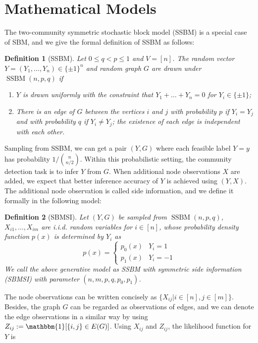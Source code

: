 \documentclass[conference]{IEEEtran}
\newtheorem{definition}{Definition}
\DeclareMathOperator{\SSBM}{SSBM}
\begin{document}
\section{Mathematical Models}\label{s:model}
The two-community symmetric stochastic block model (SSBM) is a special case of SBM, and we give the formal definition of SSBM as follows:
\begin{definition}[SSBM]
	Let $0\leq q<p\leq 1$ and $V=[n]$. The random vector $Y=(Y_1,\dots,Y_n)\in \{\pm 1\}^n$ and random graph $G$ are drawn under $\SSBM(n,p,q)$ if
	\begin{enumerate}
		\item $Y$ is drawn uniformly with the constraint that $Y_1 + \dots  + Y_n = 0$ for $Y_i \in \{\pm 1 \}$;
		
		\item There is an edge of $G$ between the vertices $i$ and $j$ with probability $p$ if $Y_i=Y_j$ and with probability $q$ if $Y_i \neq Y_j$; the existence of each edge is independent with each other.
	\end{enumerate}
\end{definition}
Sampling from SSBM, we can get a pair $(Y,G)$ where each feasible label $Y=y$ has probability $ 1/ \binom{n}{n/2}$.
Within this probabilistic setting, the community detection task is to infer $Y$ from $G$.
When
additional node observations $X$ are added, we expect that better inference accuracy of $Y$ is achieved using $(Y,X)$.
The additional node observation is called side information, and we define it formally in the following model:
\begin{definition}[SBMSI]
	Let $(Y,G)$ be sampled from $\SSBM(n,p,q)$, $X_{i1}, \dots, X_{im}$ are i.i.d. random variables for $i \in [n]$,
	whose probability density function $p(x)$ is determined by $Y_i$ as
	\begin{equation}
	p(x) = \begin{cases}
	p_0(x) & Y_i = 1 \\
	p_1(x) & Y_i = -1
	\end{cases}
	\end{equation}
	We call the above generative model as SSBM with symmetric side information (SBMSI) with parameter $(n,m,p,q,p_0,p_1)$.
\end{definition}
The node observations can be written concisely as $\{X_{ij} | i \in [n], j \in [m]\}$. Besides, the graph $G$ can be regarded as observations of edges, and
we can denote the edge observations in a similar way by using $Z_{ij}:=\mathbbm{1}[\{i,j\} \in E(G)]$.
Using $X_{ij}$ and $Z_{ij}$, the likelihood function for $Y$ is
\end{document}
